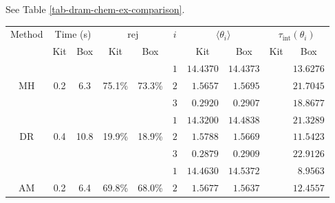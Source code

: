 See Table \ref{tab-dram-chem-ex-comparison}.

\begin{table}[h!]
\begin{center}
\begin{tabular}{|c|c|c|c|c|c|r|r|r|r|}
\hline
Method & \multicolumn{2}{c|}{Time (s)}     & \multicolumn{2}{c|}{$\text{rej}$} & $i$ & \multicolumn{2}{c|}{$\langle\theta_i\rangle$} & \multicolumn{2}{c|}{$\tau_{\text{int}}(\theta_i)$} \\
\cline{2-5}\cline{7-10}
       & Kit            & Box              & Kit           & Box               &     & \multicolumn{1}{c|}{Kit} & \multicolumn{1}{c|}{Box} & \multicolumn{1}{c|}{Kit} & \multicolumn{1}{c|}{Box} \\
\hline
\hline
       &                &                  &               &                   & $1$ & $14.4370$            & $14.4373$              &                         & $13.6276$                \\
\cline{6-10}
MH     & 0.2            & 6.3              & 75.1\%        & 73.3\%            & $2$ &  $1.5657$            &  $1.5695$              &                         & $21.7045$                \\
\cline{6-10}
       &                &                  &               &                   & $3$ &  $0.2920$            &  $0.2907$              &                         & $18.8677$                \\
\hline
\hline
       &                &                  &               &                   & $1$ & $14.3200$            & $14.4838$              &                         & $21.3289$                \\
\cline{6-10}
DR     & 0.4            & 10.8             & 19.9\%        & 18.9\%            & $2$ &  $1.5788$            &  $1.5669$              &                         & $11.5423$                \\
\cline{6-10}
       &                &                  &               &                   & $3$ &  $0.2879$            &  $0.2909$              &                         & $22.9126$                \\
\hline
\hline
       &                &                  &               &                   & $1$ & $14.4630$            & $14.5372$              &                         &  $8.9563$                \\
\cline{6-10}
AM     & 0.2            & 6.4              & 69.8\%        & 68.0\%            & $2$ &  $1.5677$            &  $1.5637$              &                         & $12.4557$                \\

\end{tabular}
\end{center}
\end{table}
